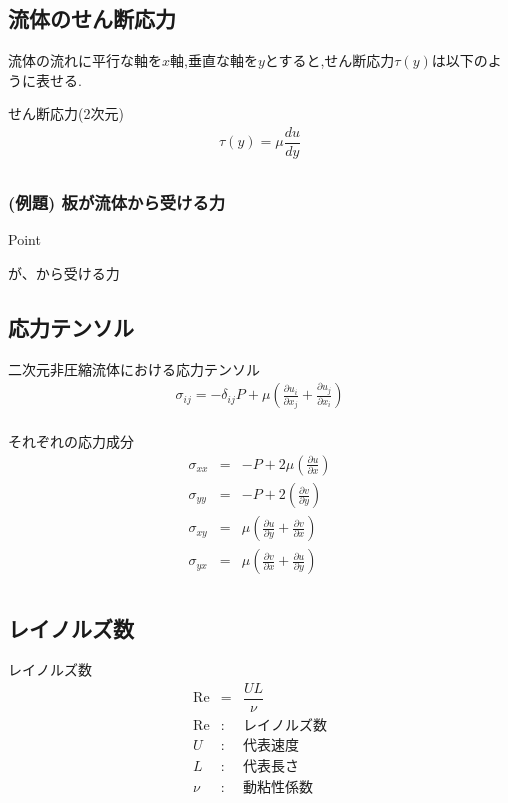 \documentclass[a4paper]{jsarticle}
\begin{document}
\subsection{流体のせん断応力}
流体の流れに平行な軸を$x$軸,垂直な軸を$y$とすると,せん断応力$\tau\left(y\right)$は以下のように表せる.
\begin{itembox}[l]{せん断応力(2次元)}
    \begin{eqnarray*}
        \tau\left(y\right)=\mu\dfrac{du}{dy}\\
    \end{eqnarray*}
\end{itembox}
\subsubsection{(例題) 板が流体から受ける力}
\begin{itembox}[l]{Point}
    \begin{center}
        が、から受ける力
    \end{center}
\end{itembox}
\subsection{応力テンソル}
\begin{itembox}[l]{二次元非圧縮流体における応力テンソル}
    \begin{eqnarray*}
        \sigma_{ij}=-\delta_{ij}P+\mu\left(\frac{\partial u_i}{\partial x_j}+\frac{\partial u_j}{\partial x_i}\right)\\
    \end{eqnarray*}
\end{itembox}
\begin{itembox}[l]{それぞれの応力成分}
    \begin{eqnarray*}
        \sigma_{xx} &=& -P+2\mu\left(\frac{\partial u}{\partial x}\right)\\
        \sigma_{yy} &=& -P+2\left(\frac{\partial v}{\partial y}\right)\\
        \sigma_{xy} &=& \mu\left(\frac{\partial u}{\partial y}+\frac{\partial v}{\partial x}\right)\\
        \sigma_{yx} &=& \mu\left(\frac{\partial v}{\partial x}+\frac{\partial u}{\partial y}\right)\\
    \end{eqnarray*}
\end{itembox}
\subsection{レイノルズ数}
\begin{itembox}[l]{レイノルズ数}
    \begin{eqnarray*}
        \mathrm{Re}&=&\dfrac{UL}{\nu}\\
        \mathrm{Re} &:& レイノルズ数\\
        U &:& 代表速度\\
        L &:& 代表長さ\\
        \nu &:& 動粘性係数\\
    \end{eqnarray*}
\end{itembox}
\end{document}

